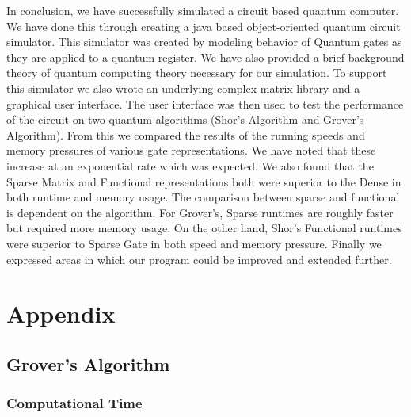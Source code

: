 \documentclass[bibliography=totocnumbered, 10pt]{article}
\theoremstyle{NoticeStyle}
\begin{document}
In conclusion, we have successfully simulated a circuit based quantum computer. We have done this through creating a java based object-oriented quantum circuit simulator.  This simulator was created by modeling  behavior of Quantum gates as they are applied to a quantum register.  We have also provided a brief background theory of quantum computing theory necessary for our simulation.  To support this simulator we also wrote an underlying complex matrix library and a graphical user interface.  The user interface was then used to test the performance of the circuit on two quantum algorithms (Shor's Algorithm and Grover's Algorithm).  From this we compared the results of the running speeds and memory pressures of various gate representations. We have noted that  these increase at an exponential rate which was expected.  We also found that the Sparse Matrix and Functional representations both were superior to the Dense in both runtime and memory usage. The comparison between sparse and functional is dependent on the algorithm.  For Grover's,  Sparse runtimes are roughly faster but required more memory usage. On the other hand, Shor's Functional runtimes were superior to Sparse Gate in both speed and memory pressure.  Finally we expressed areas in which our program could be improved and extended further.

%
\section{Appendix}

\subsection{Grover's Algorithm}

\subsubsection{Computational Time}
\end{document}
